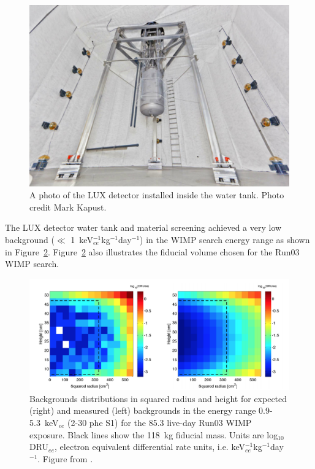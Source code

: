 \begin{figure}[htbp]
\begin{center}
\includegraphics[width=\textwidth]{figures/lux/lux_watertank.png}
\caption{A photo of the \acs{LUX} detector installed inside the water tank. Photo credit Mark Kapust.}
\label{fig:luxwatertank}
\end{center}
\end{figure}

The \ac{LUX} detector water tank and material screening achieved a very low background ($\ll$ 1~keV$_{ee}^{-1}$kg$^{-1}$day$^{-1}$) in the \ac{WIMP} search energy range as shown in Figure~\ref{fig:luxrun03bkg}. Figure~\ref{fig:luxrun03bkg} also illustrates the fiducial volume chosen for the Run03 \ac{WIMP} search.

\begin{figure}[htbp]
\begin{center}
\includegraphics[width=\textwidth]{figures/lux/lux_run03bkg.png}
\caption{Backgrounds distributions in squared radius and height for expected (right) and measured (left) backgrounds in the energy range 0.9-5.3~keV$_{ee}$ (2-30 phe S1) for the 85.3 live-day Run03 \acs{WIMP} exposure. Black lines show the 118~kg fiducial mass. Units are log$_{10}$DRU$_{ee}$, electron equivalent differential rate units, i.e. keV$_{ee}^{-1}$kg$^{-1}$day$^{-1}$.  Figure from \cite{LUXRun03Backgrounds}. }
\label{fig:luxrun03bkg}
\end{center}
\end{figure}


